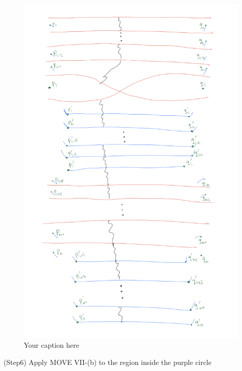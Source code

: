 \begin{figure}[H] %
    \centering
    \includegraphics[width=\linewidth]{diagrams/definition12/14.png} %
    \caption{Your caption here}
    \label{fig:your-label}
\end{figure}

(Step6) Apply MOVE \RN{7}-(b) to the region inside the purple circle

